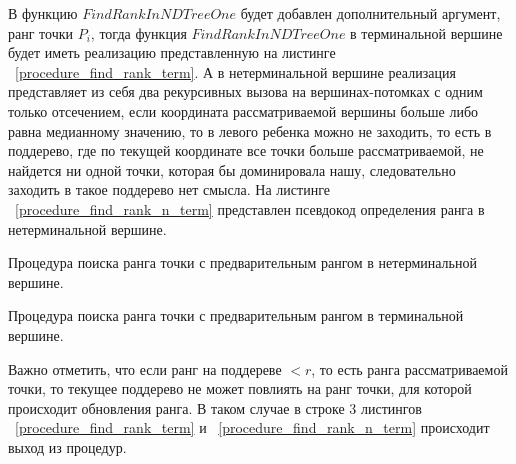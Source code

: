 В функцию $FindRankInNDTreeOne$ будет добавлен дополнительный аргумент, ранг точки $P_i$, тогда функция $FindRankInNDTreeOne$ в терминальной вершине будет иметь реализацию представленную на листинге ~\ref{procedure_find_rank_term}. А в нетерминальной вершине реализация представляет из себя два рекурсивных вызова на вершинах-потомках с одним только отсечением, если координата рассматриваемой вершины больше либо равна медианному значению, то в левого ребенка можно не заходить, то есть в поддерево, где по текущей координате все точки больше рассматриваемой, не найдется ни одной точки, которая бы доминировала нашу, следовательно заходить в такое поддерево нет смысла. На листинге ~\ref{procedure_find_rank_n_term} представлен псевдокод определения ранга в нетерминальной вершине.

\begin{algorithm}
\begin{algorithmic}[1]
    \EndIf

    \EndIf
    
\EndProcedure
\end{algorithmic}
\caption{Процедура поиска ранга точки с предварительным рангом в нетерминальной вершине.}
\label{procedure_find_rank_n_term}
\end{algorithm}

\begin{algorithm}
\begin{algorithmic}[1]
    \EndIf
        \EndIf
    \EndFor
\EndProcedure
\end{algorithmic}
\caption{Процедура поиска ранга точки с предварительным рангом в терминальной вершине.}
\label{procedure_find_rank_term}
\end{algorithm}

Важно отметить, что если ранг на поддереве $< r$, то есть ранга рассматриваемой точки, то текущее поддерево не может повлиять на ранг точки, для которой происходит обновления ранга. В таком случае в строке 3 листингов ~\ref{procedure_find_rank_term} и ~\ref{procedure_find_rank_n_term} происходит выход из процедур.





